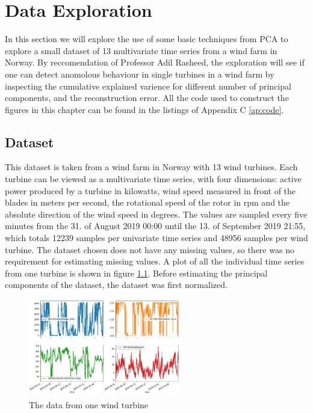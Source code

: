 \chapter{Data Exploration} \label{chap:data_exp}

In this section we will explore the use of some basic techniques from PCA to explore a small dataset of 13 multivariate time series from a wind farm in Norway.  
By reccomendation of Professor Adil Rasheed, the exploration will see if one can detect anomolous behaviour in single turbines in a wind farm by inspecting the cumulative explained varience for different number of principal components, and the reconstruction error.
All the code used to construct the figures in this chapter can be found in the listings of Appendix C \ref{ap:code}.

\section{Dataset}

This dataset is taken from a wind farm in Norway with 13 wind turbines. 
Each turbine can be viewed as a multivariate time series, with four dimensions: active power produced by a turbine in kilowatts, wind speed measured in front of the blades in meters per second, the rotational speed of the rotor in rpm and the absolute direction of the wind speed in degrees. 
The values are sampled every five minutes from the 31. of August 2019 00:00 until the 13. of September 2019 21:55, which totals 12239 samples per univariate time series and 48956 samples per wind turbine. 
The dataset chosen does not have any missing values, so there was no requirement for estimating missing values. 
A plot of all the individual time series from one turbine is shown in figure \ref{fig:data_one_wt}.
Before estimating the principal components of the dataset, the dataset was first normalized. \bigskip

\begin{figure}
    \begin{center}
    \includegraphics[width=0.6\textwidth]{data_exp/one_turbine_all_vals}
    \end{center}
    \caption{The data from one wind turbine} 
    \label{fig:data_one_wt}
\end{figure}

